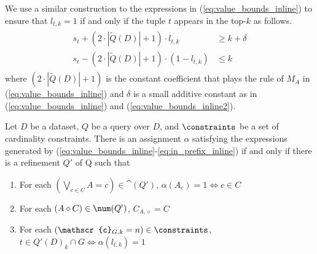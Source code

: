 We use a similar construction to the expressions in (\ref{eq:value_bounds_inline}) to ensure that $l_{t, k} = 1$ if and only if the tuple $t$ appears in the top-$k$ as follows.
\begin{align}
\begin{split}
    s_t + (2 \cdot |\widetilde{Q}(D)| + 1) \cdot l_{t, k} &\geq k + \delta \label{eq:in_prefix_inline} \\
    s_t - (2 \cdot |\widetilde{Q}(D)| + 1) \cdot (1 - l_{t, k}) &\leq k
\end{split}
\end{align}
where $(2 \cdot |\widetilde{Q}(D)| + 1)$ is the constant coefficient that plays the rule of $M_A$ in (\ref{eq:value_bounds_inline}) and $\delta$ is a small additive constant as in (\ref{eq:value_bounds_inline}) and (\ref{eq:value_bounds_inline2}). 
\iftechreport
\begin{lemma}
\label{thm:same-top-k}
    Let $D$ be a dataset, $Q$ be a query over $D$, and $\constraints$ be a set of cardinality constraints. There is an assignment $\alpha$ satisfying the expressions generated by (\ref{eq:value_bounds_inline}-\ref{eq:in_prefix_inline}) if and only if there is a refinement $Q'$ of Q such that
    \begin{enumerate}[label=\numbercircled{\arabic*}]
        \item For each $(\bigvee_{c \in C} A = c) \in \cat(Q')$, $\alpha(A_c) = 1 \iff c \in C$
        \item For each $(A \diamond C) \in \num(Q')$, $C_{A, \diamond} = C$
        \item For each $(\mathscr{c}_{G, k} = n) \in \constraints$, $t \in Q'(D)_k \cap G \iff \alpha(l_{t, k}) = 1$
    \end{enumerate}
\end{lemma}
